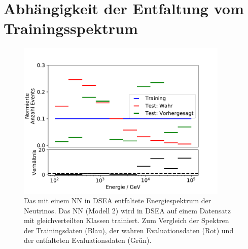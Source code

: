 \chapter{Abhängigkeit der Entfaltung vom Trainingsspektrum}

\begin{figure}
    \centering
    \includegraphics[width=0.9\textwidth]{Plots/BIAS/DSEA/spectrum_16it_60ep_True.pdf}
    \caption[Überprüfung des Bias: Spektrum des 2. Modells in DSEA]{Das mit einem NN in DSEA entfaltete Energiespektrum der Neutrinos.
    Das NN (Modell 2) wird in DSEA auf einem Datensatz mit gleichverteilten Klassen trainiert.
    Zum Vergleich der Spektren der Trainingsdaten (Blau), der wahren Evaluationsdaten (Rot) und der entfalteten Evaluationsdaten (Grün).
    }
    \label{fig:bias_dsea_true}
\end{figure}